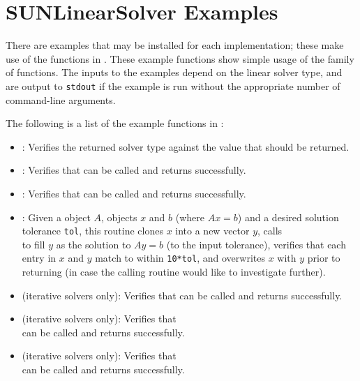 \section{SUNLinearSolver Examples}\label{ss:sunlinsol_examples}

There are  examples that may be installed for each
implementation; these make use of the functions in .
These example functions show simple usage of the  family
of functions.  The inputs to the examples depend on the linear solver type,
and are output to \texttt{stdout} if the example is run without the
appropriate number of command-line arguments.

\noindent The following is a list of the example functions in :
\begin{itemize}
\item {}: Verifies the returned solver type against
  the value that should be returned.
\item {}: Verifies that 
  can be called and returns successfully.
\item {}: Verifies that  can
  be called and returns successfully.
\item {}: Given a {\sunmatrix} object $A$,
  {\nvector} objects $x$ and $b$ (where $Ax=b$) and a desired solution
  tolerance \texttt{tol}, this routine clones $x$ into a new vector $y$,
  calls \\ \noindent
   to fill $y$ as the solution to $Ay=b$ (to
  the input tolerance), verifies that each entry in $x$ and $y$
  match to within \texttt{10*tol}, and overwrites $x$ with $y$ prior
  to returning (in case the calling routine would like to investigate
  further).
\item {} (iterative solvers only): Verifies that
   can be called and returns successfully.
\item {} (iterative solvers only):
  Verifies that \\ \noindent
   can be called and
  returns successfully.
\item {} (iterative solvers only):
  Verifies that \\ \noindent
   can be called and
  returns successfully.

\end{itemize}
